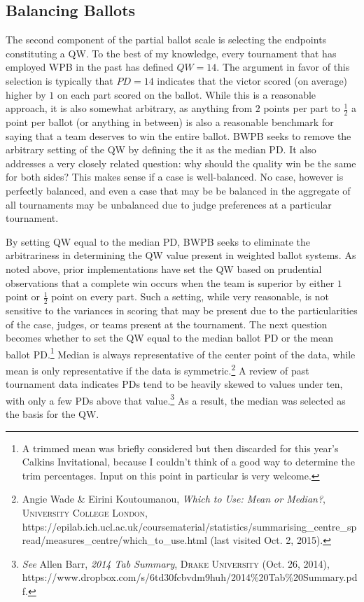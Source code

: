 \documentclass{article}
\begin{document}
\subsection{Balancing Ballots}
\label{balancingBallots}
The second component of the partial ballot scale is selecting the endpoints constituting a QW.  To the best of my knowledge, every tournament that has employed WPB in the past has defined $QW=14$.  The argument in favor of this selection is typically that $PD=14$ indicates that the victor scored (on average) higher by $1$ on each part scored on the ballot.  While this is a reasonable approach, it is also somewhat arbitrary, as anything from $2$ points per part to $\frac{1}{2}$ a point per ballot (or anything in between) is also a reasonable benchmark for saying that a team deserves to win the entire ballot. BWPB seeks to remove the arbitrary setting of the QW by defining the it as the median PD. It also addresses a very closely related question:  why should the quality win be the same for both sides?  This makes sense if a case is well-balanced. No case, however is perfectly balanced, and even a case that may be be balanced in the aggregate of all tournaments may be unbalanced due to judge preferences at a particular tournament.

By setting QW equal to the median PD, BWPB seeks to eliminate the arbitrariness in determining the QW value present in weighted ballot systems. As noted above, prior implementations have set the QW based on prudential observations that a complete win occurs when the team is superior by either $1$ point or $\frac{1}{2}$ point on every part. Such a setting, while very reasonable, is not sensitive to the variances in scoring that may be present due to the particularities of the case, judges, or teams present at the tournament. The next question becomes whether to set the QW equal to the median ballot PD or the mean ballot PD.\footnote{A trimmed mean was briefly considered but then discarded for this year's Calkins Invitational, because I couldn't think of a good way to determine the trim percentages. Input on this point in particular is very welcome.} Median is always representative of the center point of the data, while mean is only representative if the data is symmetric.\footnote{Angie Wade \& Eirini Koutoumanou, \textit{Which to Use: Mean or Median?}, \textsc{University College London}, https://epilab.ich.ucl.ac.uk/coursematerial/statistics/summarising\_centre\_spread/measures\_centre/which\_to\_use.html (last visited Oct. 2, 2015).} A review of past tournament data indicates PDs tend to be heavily skewed to values under ten, with only a few PDs above that value.\footnote{\textit{See} Allen Barr, \textit{2014 Tab Summary}, \textsc{Drake University} (Oct. 26, 2014), https://www.dropbox.com/s/6td30fcbvdm9huh/2014\%20Tab\%20Summary.pdf.} As a result, the median was selected as the basis for the QW.
\end{document}
